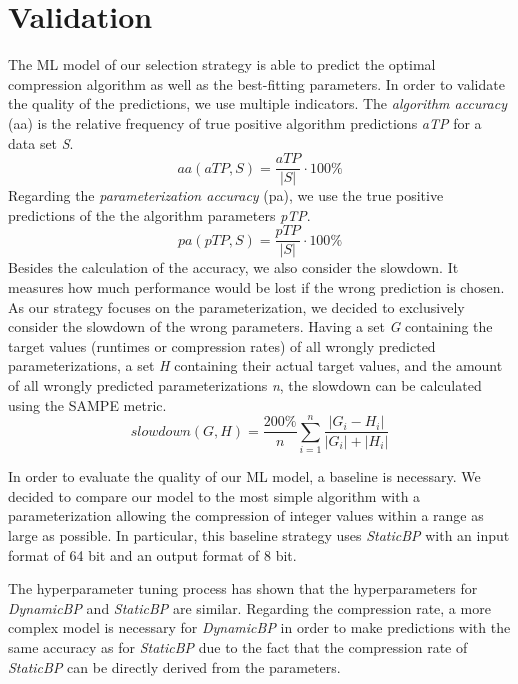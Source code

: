 \section{Validation}
The ML model of our selection strategy is able to predict the optimal compression algorithm as well as the best-fitting parameters. In order to validate the quality of the predictions, we use multiple indicators. The \emph{algorithm accuracy} (aa) is the relative frequency of true positive algorithm predictions \emph{aTP} for a data set \emph{S}.   
\begin{equation} \label{eq:algo_accuracy}
    aa(aTP, S) = \frac{aTP}{|S|} \cdot 100\%
\end{equation}
Regarding the \emph{parameterization accuracy} (pa), we use the true positive predictions of the the algorithm parameters \emph{pTP}.
\begin{equation} \label{eq:param_accuracy}
    pa(pTP, S) = \frac{pTP}{|S|} \cdot 100\%
\end{equation}
Besides the calculation of the accuracy, we also consider the slowdown. It measures how much performance would be lost if the wrong prediction is chosen. As our strategy focuses on the parameterization, we decided to exclusively consider the slowdown of the wrong parameters. Having a set \emph{G} containing the target values (runtimes or compression rates) of all wrongly predicted parameterizations, a set \emph{H} containing their actual target values, and the amount of all wrongly predicted parameterizations \emph{n}, the slowdown can be calculated using the SAMPE metric.
\begin{equation} \label{eq:slowdown}
    slowdown(G,H) = \frac{200\%}{n} \sum_{i = 1}^{n} \frac{|G_{i} - H_{i}|}{|G_{i}| + |H_{i}|}
\end{equation}

In order to evaluate the quality of our ML model, a baseline is necessary. We decided to compare our model to the most simple algorithm with a parameterization allowing the compression of integer values within a range as large as possible. In particular, this baseline strategy uses \emph{StaticBP} with an input format of 64 bit and an output format of 8 bit.

The hyperparameter tuning process has shown that the hyperparameters for \emph{DynamicBP} and \emph{StaticBP} are similar. Regarding the compression rate, a more complex model is necessary for \emph{DynamicBP} in order to make predictions with the same accuracy as for \emph{StaticBP} due to the fact that the compression rate of \emph{StaticBP} can be directly derived from the parameters.

